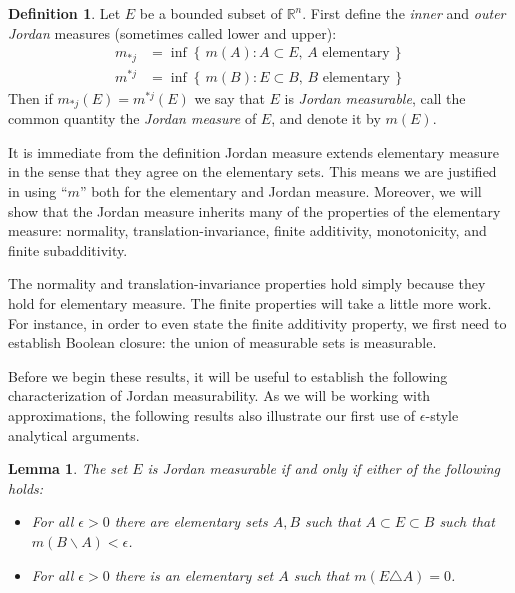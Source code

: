 \documentclass[11pt,oneside]{amsbook}
\newcommand{\set}[1]{\left\{\,#1\,\right\}}
\renewcommand{\setminus}{\smallsetminus}
\newcommand{\RR}{{\mathbb R}}
\theoremstyle{definition}
\theoremstyle{plain}
\newtheorem{lem}[thm]{Lemma}
\theoremstyle{definition}
\newtheorem{defn}[thm]{Definition}
\theoremstyle{remark}
\numberwithin{equation}{section}
\numberwithin{figure}{section}
\begin{document}
\begin{defn}
  Let $E$ be a bounded subset of $\RR^n$. First define the \emph{inner} and \emph{outer Jordan} measures (sometimes called lower and upper):
  \begin{align*}
    m_{*j}&=\inf\set{m(A):A\subset E,\, A\text{ elementary}}\\
    m^{*j}&=\inf\set{m(B):E\subset B,\, B\text{ elementary}}
  \end{align*}
  Then if $m_{*j}(E)=m^{*j}(E)$ we say that $E$ is \emph{Jordan measurable}, call the common quantity the \emph{Jordan measure} of $E$, and denote it by $m(E)$.
\end{defn}

It is immediate from the definition Jordan measure extends elementary measure in the sense that they agree on the elementary sets. This means we are justified in using ``$m$'' both for the elementary and Jordan measure. Moreover, we will show that the Jordan measure inherits many of the properties of the elementary measure: normality, translation-invariance, finite additivity, monotonicity, and finite subadditivity.

The normality and translation-invariance properties hold simply because they hold for elementary measure. The finite properties will take a little more work. For instance, in order to even state the finite additivity property, we first need to establish Boolean closure: the union of measurable sets is measurable.

Before we begin these results, it will be useful to establish the following characterization of Jordan measurability. As we will be working with approximations, the following results also illustrate our first use of $\epsilon$-style analytical arguments.

\begin{lem}
  \label{lem:jordan-equiv}
  The set $E$ is Jordan measurable if and only if either of the following holds:
  \begin{itemize}
  \item For all $\epsilon>0$ there are elementary sets $A,B$ such that $A\subset E\subset B$ such that $m(B\setminus A)<\epsilon$.
  \item For all $\epsilon>0$ there is an elementary set $A$ such that $m(E\triangle A)=0$.
  \end{itemize}
\end{lem}
\end{document}
